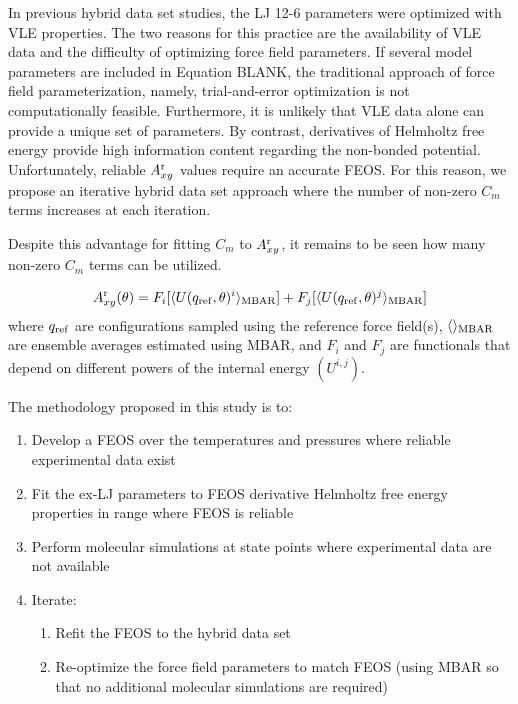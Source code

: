 \documentclass[11pt,a4paper]{article}
\begin{document}


In previous hybrid data set studies, the LJ 12-6 parameters were optimized with VLE properties. The two reasons for this practice are the availability of VLE data and the difficulty of optimizing force field parameters. If several model parameters are included in Equation BLANK, the traditional approach of force field parameterization, namely, trial-and-error optimization is not computationally feasible. Furthermore, it is unlikely that VLE data alone can provide a unique set of parameters. By contrast, derivatives of Helmholtz free energy provide high information content regarding the non-bonded potential. Unfortunately, reliable $A_{xy}^{\rm r}$ values require an accurate FEOS. For this reason, we propose an iterative hybrid data set approach where the number of non-zero $C_m$ terms increases at each iteration.

Despite this advantage for fitting $C_m$ to $A_{xy}^{\rm r}$, it remains to be seen how many non-zero $C_m$ terms can be utilized.

\begin{equation}
A_{xy}^{\rm r}(\theta) = F_i[\langle U(q_{\rm ref},\theta)^i \rangle_{\rm MBAR}] + F_j[\langle U(q_{\rm ref},\theta)^j \rangle_{\rm MBAR}]
\end{equation}
where $q_{\rm ref}$ are configurations sampled using the reference force field(s), $\langle\rangle_{\rm MBAR}$ are ensemble averages estimated using MBAR, and $F_i$ and $F_j$ are functionals that depend on different powers of the internal energy $(U^{i,j})$. 

The methodology proposed in this study is to:
\begin{enumerate}
	\item Develop a FEOS over the temperatures and pressures where reliable experimental data exist
	\item Fit the ex-LJ parameters to FEOS derivative Helmholtz free energy properties in range where FEOS is reliable
	\item Perform molecular simulations at state points where experimental data are not available
	\item Iterate:
	\begin{enumerate}
		\item Refit the FEOS to the hybrid data set
		\item Re-optimize the force field parameters to match FEOS (using MBAR so that no additional molecular simulations are required)
	\end{enumerate}
\end{enumerate}
\end{document}
